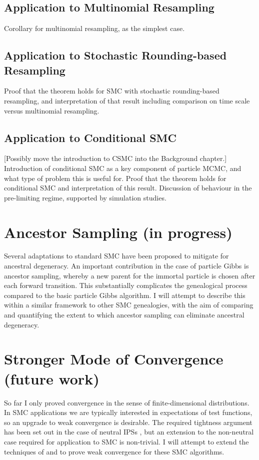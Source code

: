 \documentclass{article}
\begin{document}
\subsection{Application to Multinomial Resampling}
Corollary for multinomial resampling, as the simplest case.
\subsection{Application to Stochastic Rounding-based Resampling}
Proof that the theorem holds for SMC with stochastic rounding-based resampling, and interpretation of that result including comparison on time scale versus multinomial resampling.
\subsection{Application to Conditional SMC}
[Possibly move the introduction to CSMC into the Background chapter.]
Introduction of conditional SMC as a key component of particle MCMC, and what type of problem this is useful for. Proof that the theorem holds for conditional SMC and interpretation of this result. Discussion of behaviour in the pre-limiting regime, supported by simulation studies.

\section{Ancestor Sampling (in progress)} %
Several adaptations to standard SMC have been proposed to mitigate for ancestral degeneracy. An important contribution in the case of particle Gibbs is ancestor sampling, whereby a new parent for the immortal particle is chosen after each forward transition. This substantially complicates the genealogical process compared to the basic particle Gibbs algorithm. I will attempt to describe this within a similar framework to other SMC genealogies, with the aim of comparing and quantifying the extent to which ancestor sampling can eliminate ancestral degeneracy.

\section{Stronger Mode of Convergence (future work)}
So far I only proved convergence in the sense of finite-dimensional distributions. In SMC applications we are typically interested in expectations of test functions, so an upgrade to weak convergence is desirable. The required tightness argument has been set out in the case of neutral IPSs \citep{mohle1999}, but an extension to the non-neutral case required for application to SMC is non-trivial. I will attempt to extend the techniques of \citet{mohle1999} and \citet{gerber2017} to prove weak convergence for these SMC algorithms.
\end{document}

